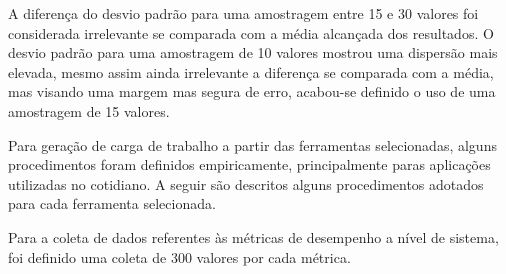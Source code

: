 A diferença do desvio padrão para uma amostragem entre 15 e 30 valores foi considerada irrelevante se comparada com a média alcançada dos resultados. O desvio padrão para uma amostragem de 10 valores mostrou uma dispersão mais elevada, mesmo assim ainda irrelevante a diferença se comparada com a média, mas visando uma margem mas segura de erro, acabou-se definido o uso de uma amostragem de 15 valores. 

Para geração de carga de trabalho a partir das ferramentas selecionadas, alguns procedimentos foram definidos empiricamente, principalmente paras aplicações utilizadas no cotidiano. A seguir são descritos alguns procedimentos adotados para cada ferramenta selecionada.

Para a coleta de dados referentes às métricas de desempenho a nível de sistema, foi definido uma coleta de 300 valores por cada métrica. 
